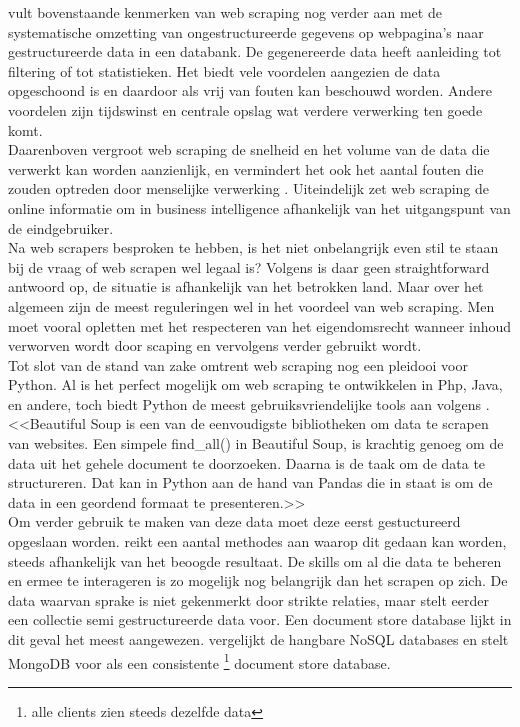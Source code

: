 \textcite{Singrodia2019} vult bovenstaande kenmerken van web scraping nog verder aan met de systematische omzetting van ongestructureerde gegevens op webpagina's naar gestructureerde data in een databank. De gegenereerde data heeft aanleiding tot filtering of tot statistieken. Het biedt vele voordelen aangezien de data opgeschoond is en daardoor als vrij van fouten kan beschouwd worden. Andere voordelen zijn tijdswinst en centrale opslag wat verdere verwerking ten goede komt.\\
Daarenboven vergroot web scraping de snelheid en het volume van de data die verwerkt kan worden aanzienlijk, en vermindert het ook het aantal fouten die zouden optreden door menselijke verwerking \autocite{Bhatt2023}. Uiteindelijk zet web scraping de online informatie om in business intelligence afhankelijk van het uitgangspunt van de eindgebruiker.\\
Na web scrapers besproken te hebben, is het niet onbelangrijk even stil te staan bij de vraag of web scrapen wel legaal is? Volgens \textcite{EPSI2015} is daar geen straightforward antwoord op, de situatie is afhankelijk van het betrokken land. Maar over het algemeen zijn de meest reguleringen wel in het voordeel van web scraping. Men moet vooral opletten met het respecteren van het eigendomsrecht wanneer inhoud verworven wordt door scaping en vervolgens verder gebruikt wordt.\\
Tot slot van de stand van zake omtrent web scraping nog een pleidooi voor Python. Al is het perfect mogelijk om web scraping te ontwikkelen in Php, Java, en andere, toch biedt Python de meest gebruiksvriendelijke tools aan volgens \textcite{Kumar2023}. <<Beautiful Soup is een van de eenvoudigste bibliotheken om data te scrapen van websites. Een simpele find\_all() in Beautiful Soup, is krachtig genoeg om de data uit het gehele document te doorzoeken. Daarna is de taak om de data te structureren. Dat kan in Python aan de hand van Pandas die in staat is om de data in een geordend formaat te presenteren.>>\\
Om verder gebruik te maken van deze data moet deze eerst gestuctureerd opgeslaan worden. \textcite{Mitchell2015} reikt een aantal methodes aan waarop dit gedaan kan worden, steeds afhankelijk van het beoogde resultaat. De skills om al die data te beheren en ermee te interageren is zo mogelijk nog belangrijk dan het scrapen op zich. De data waarvan sprake is niet gekenmerkt door strikte relaties, maar stelt eerder een collectie semi gestructureerde data voor. Een document store database lijkt in dit geval het meest aangewezen. \textcite{Lourenco2015} vergelijkt de hangbare NoSQL databases en stelt MongoDB voor als een consistente \footnote{alle clients zien steeds dezelfde data} document store database.\\
